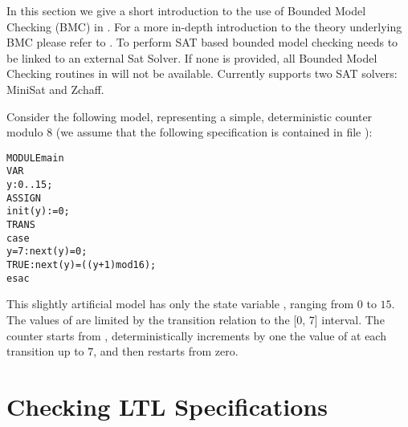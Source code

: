 In this section we give a short introduction to the use of Bounded Model
Checking (BMC) in \nusmv. For a more in-depth 
introduction to the theory underlying BMC please refer to \cite{BCCZ99}.
%
To perform SAT based bounded model checking \nusmv needs to be linked
to an external Sat Solver. If none is provided, all Bounded Model
Checking routines in \nusmv will not be available. Currently
\nusmv supports two SAT solvers: MiniSat and Zchaff.


Consider the following model, representing a simple, deterministic
counter modulo $8$ (we assume that the following specification is
contained in file ):
\begin{alltt}
MODULE main
VAR 
  y : 0..15;
ASSIGN 
  init(y) := 0;
TRANS
  case
     y = 7 :  next(y) = 0; 
     TRUE  :  next(y) = ((y + 1) mod 16);
  esac
\end{alltt}

This slightly artificial model has only the state variable , ranging
from $0$ to $15$. The values of  are limited by the transition relation
to the [0, 7] interval. The counter starts from , deterministically
increments by one the value of  at each transition up to $7$, and then
restarts from zero. 

\section{Checking LTL Specifications}
\label{Checking LTL Specifications}

